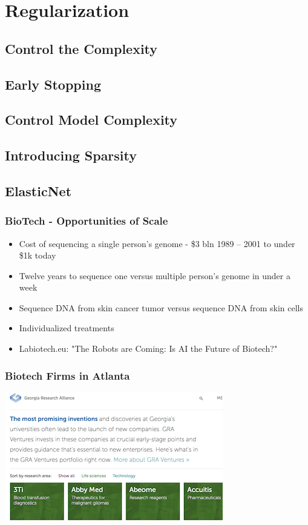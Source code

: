 \documentclass{beamer}
\begin{document}
\section{Regularization}
\subsection{Control the Complexity}
\subsection{Early Stopping}
\subsection{Control Model Complexity}
\subsection{Introducing Sparsity}
\subsection{ElasticNet}

\begin{frame}
\frametitle{BioTech - Opportunities of Scale}
\begin{itemize}
\item Cost of sequencing a single person's genome - \$3 bln 1989 -- 2001 to under \$1k today
\item Twelve years to sequence one versus multiple person's genome in under a week
\item Sequence DNA from skin cancer tumor versus sequence DNA from skin cells
\item Individualized treatments
\item Labiotech.eu: "The Robots are Coming: Is AI the Future of Biotech?"
\end{itemize}
\end{frame}

\begin{frame}
\frametitle{Biotech Firms in Atlanta}

\includegraphics{gra}

\end{frame}
\end{document}
